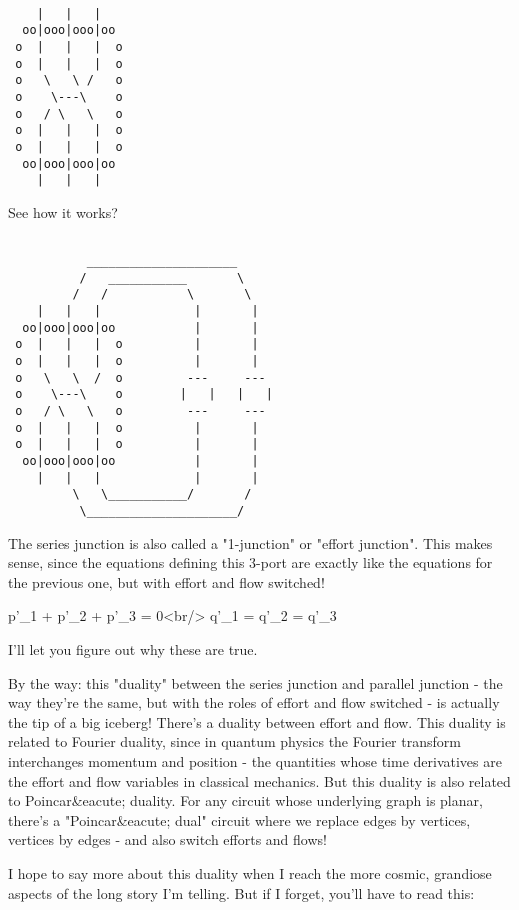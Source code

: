 \begin{verbatim}

    |   |   |
  oo|ooo|ooo|oo
 o  |   |   |  o
 o  |   |   |  o
 o   \   \ /   o
 o    \---\    o
 o   / \   \   o
 o  |   |   |  o
 o  |   |   |  o
  oo|ooo|ooo|oo
    |   |   |
\end{verbatim}
    

See how it works?


\begin{verbatim}

           _____________________
          /   ___________       \
         /   /           \       \
    |   |   |             |       |
  oo|ooo|ooo|oo           |       |
 o  |   |   |  o          |       |
 o  |   |   |  o          |       |
 o   \   \  /  o         ---     ---
 o    \---\    o        |   |   |   |
 o   / \   \   o         ---     ---
 o  |   |   |  o          |       |
 o  |   |   |  o          |       |
  oo|ooo|ooo|oo           |       |
    |   |   |             |       |
         \   \___________/       /  
          \_____________________/    
\end{verbatim}
    

The series junction is also called a "1-junction" or "effort
junction".  This makes sense, since the equations defining this 3-port
are exactly like the equations for the previous one, but with effort
and flow switched!

  p'_{1} + p'_{2} + p'_{3} = 0<br/>
  q'_{1} = q'_{2} = q'_{3}

I'll let you figure out why these are true.  

By the way: this "duality" between the series junction and
parallel junction - the way they're the same, but with the roles of
effort and flow switched - is actually the tip of a big iceberg!
There's a duality between effort and flow.  This duality is related to
Fourier duality, since in quantum physics the Fourier transform
interchanges momentum and position - the quantities whose time
derivatives are the effort and flow variables in classical mechanics.
But this duality is also related to Poincar&eacute; duality.  For any
circuit whose underlying graph is planar, there's a
"Poincar&eacute; dual" circuit where we replace edges by
vertices, vertices by edges - and also switch efforts and flows!

I hope to say more about this duality when I reach the more cosmic,
grandiose aspects of the long story I'm telling.  But if I forget,
you'll have to read this:

